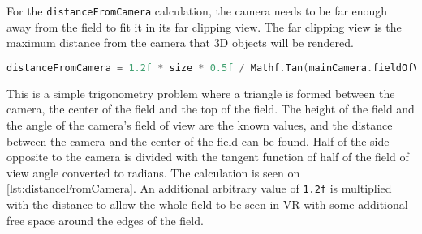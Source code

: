 For the \texttt{distanceFromCamera} calculation, the camera needs to be far enough away from the field to fit it in its far clipping view.
The far clipping view is the maximum distance from the camera that 3D objects will be rendered.
\begin{lstlisting}[caption={Calculation of the distance between the camera and field.}, captionpos=b,language=C,label={lst:distanceFromCamera}]
    distanceFromCamera = 1.2f * size * 0.5f / Mathf.Tan(mainCamera.fieldOfView * 0.5f * Mathf.Deg2Rad);
\end{lstlisting}
This is a simple trigonometry problem where a triangle is formed between the camera, the center of the field and the top of the field.
The height of the field and the angle of the camera's field of view are the known values, and the distance between the camera and the center of the field can be found. 
Half of the side opposite to the camera is divided with the tangent function of half of the field of view angle converted to radians.
The calculation is seen on \autoref{lst:distanceFromCamera}.
An additional arbitrary value of \texttt{1.2f} is multiplied with the distance to allow the whole field to be seen in VR with some additional free space around the edges of the field.

